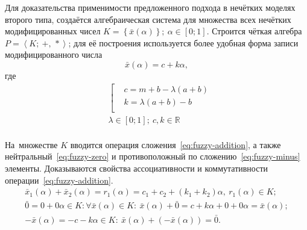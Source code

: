 Для доказательства применимости предложенного подхода в нечётких моделях второго типа, создаётся алгебраическая система для множества всех нечётких модифицированных чисел $K=\left\{ \bar{x}\left( \alpha  \right) \right\};\ \alpha \in \left[ 0;1 \right]$. Строится чёткая алгебра $P=\left\langle K ;\ +,\,* \right\rangle$; для её построения используется более удобная форма записи модифицированного числа
\begin{equation}
\label{eq:modified-number-base}
  \bar{x}\left( \alpha  \right)=c+k\alpha,
\end{equation}
где
\begin{equation}
\label{eq:modified-number-from-abm}
  \begin{aligned}
    & \left[ \begin{aligned}
    & c=m+b-\lambda \left( a+b \right) \\ 
    & k=\lambda \left( a+b \right)-b \\ 
  \end{aligned} \right. \\ 
  & \lambda \in \left[ 0;1 \right];\ c,k\in \mathbb{R} \\ 
\end{aligned}
\end{equation}

На~множестве $K$ вводится операция сложения~\eqref{eq:fuzzy-addition}, а также нейтральный~\eqref{eq:fuzzy-zero} и противоположный по сложению~\eqref{eq:fuzzy-minus} элементы. Доказываются свойства ассоциативности и коммутативности операции~\eqref{eq:fuzzy-addition}.
\begin{gather}
  \label{eq:fuzzy-addition}
  \bar{x}_1\left(\alpha \right)+\bar{x}_2\left(\alpha \right)=r_1\left( \alpha  \right)=c_1+c_2+\left(k_1+k_2 \right)\alpha,\ r_1 \left( \alpha  \right)\in K;\\
  \label{eq:fuzzy-zero}
  \bar{0}=0+0\alpha \in K: \forall \bar{x}(\alpha )\in K:\ \bar{x}(\alpha )+\bar{0}=c+k\alpha +0+0\alpha =\bar{x}(\alpha );\\
  \label{eq:fuzzy-minus}
  -\bar{x}\left(\alpha \right)=-c-k\alpha \in K:\ \bar{x}\left( \alpha  \right)+\left( -\bar{x}\left( \alpha  \right) \right)=\bar{0}. 
\end{gather}

